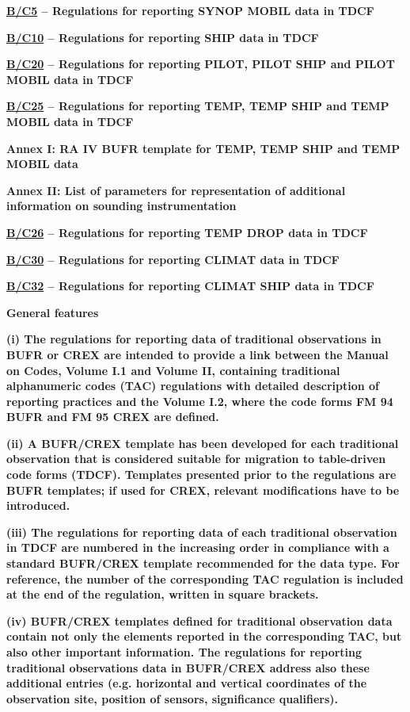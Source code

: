 \textbf{\href{WMO306_vI2_BUFRCREX_BC5_en.pdf}{B/C5} -- Regulations for reporting SYNOP MOBIL data in TDCF}

\textbf{\href{WMO306_vI2_BUFRCREX_BC10_en.pdf}{B/C10} -- Regulations for reporting SHIP data in TDCF}

\textbf{\href{WMO306_vI2_BUFRCREX_BC20_en.pdf}{B/C20} -- Regulations for reporting PILOT, PILOT SHIP and PILOT MOBIL data in TDCF}

\textbf{\href{WMO306_vI2_BUFRCREX_BC25_en.pdf}{B/C25} -- Regulations for reporting TEMP, TEMP SHIP and TEMP MOBIL data in TDCF}

\textbf{Annex I: RA IV BUFR template for TEMP, TEMP SHIP and TEMP MOBIL data}

\textbf{Annex II: List of parameters for representation of additional information on sounding instrumentation}

\textbf{\href{WMO306_vI2_BUFRCREX_BC26_en.pdf}{B/C26} -- Regulations for reporting TEMP DROP data in TDCF}

\textbf{\href{WMO306_vI2_BUFRCREX_BC30_en.pdf}{B/C30} -- Regulations for reporting CLIMAT data in TDCF}

\textbf{\href{WMO306_vI2_BUFRCREX_BC32_en.pdf}{B/C32} -- Regulations for reporting CLIMAT SHIP data in TDCF}

\textbf{General features}

\textbf{(i) The regulations for reporting data of traditional observations in BUFR or CREX are intended to provide a link between the Manual on Codes, Volume I.1 and Volume II, containing traditional alphanumeric codes (TAC) regulations with detailed description of reporting practices and the Volume I.2, where the code forms FM 94 BUFR and FM 95 CREX are defined.}

\textbf{(ii) A BUFR/CREX template has been developed for each traditional observation that is considered suitable for migration to table-driven code forms (TDCF). Templates presented prior to the regulations are BUFR templates; if used for CREX, relevant modifications have to be introduced.}

\textbf{(iii) The regulations for reporting data of each traditional observation in TDCF are numbered in the increasing order in compliance with a standard BUFR/CREX template recommended for the data type. For reference, the number of the corresponding TAC regulation is included at the end of the regulation, written in square brackets.}

\textbf{(iv) BUFR/CREX templates defined for traditional observation data contain not only the elements reported in the corresponding TAC, but also other important information. The regulations for reporting traditional observations data in BUFR/CREX address also these additional entries (e.g. horizontal and vertical coordinates of the observation site, position of sensors, significance qualifiers).}

